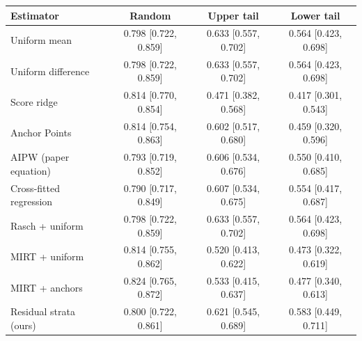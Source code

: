\begin{tabular}{lccc}
\toprule
Estimator & Random & Upper tail & Lower tail \\
\midrule
Uniform mean & 0.798 [0.722, 0.859] & 0.633 [0.557, 0.702] & 0.564 [0.423, 0.698] \\
Uniform difference & 0.798 [0.722, 0.859] & 0.633 [0.557, 0.702] & 0.564 [0.423, 0.698] \\
Score ridge & 0.814 [0.770, 0.854] & 0.471 [0.382, 0.568] & 0.417 [0.301, 0.543] \\
Anchor Points & 0.814 [0.754, 0.863] & 0.602 [0.517, 0.680] & 0.459 [0.320, 0.596] \\
AIPW (paper equation) & 0.793 [0.719, 0.852] & 0.606 [0.534, 0.676] & 0.550 [0.410, 0.685] \\
Cross-fitted regression & 0.790 [0.717, 0.849] & 0.607 [0.534, 0.675] & 0.554 [0.417, 0.687] \\
Rasch + uniform & 0.798 [0.722, 0.859] & 0.633 [0.557, 0.702] & 0.564 [0.423, 0.698] \\
MIRT + uniform & 0.814 [0.755, 0.862] & 0.520 [0.413, 0.622] & 0.473 [0.322, 0.619] \\
MIRT + anchors & 0.824 [0.765, 0.872] & 0.533 [0.415, 0.637] & 0.477 [0.340, 0.613] \\
Residual strata (ours) & 0.800 [0.722, 0.861] & 0.621 [0.545, 0.689] & 0.583 [0.449, 0.711] \\
\bottomrule
\end{tabular}

